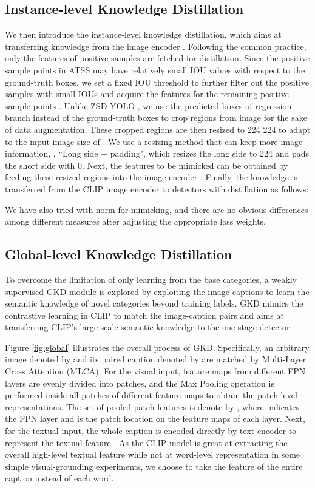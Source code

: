\documentclass[10pt,twocolumn,letterpaper]{article}
\begin{document}
\subsection{Instance-level Knowledge Distillation}
\label{sec: ins-level}
We then introduce the instance-level knowledge distillation, which aims at transferring knowledge from the image encoder . Following the common practice, only the features of positive samples are fetched for distillation. Since the positive sample points in ATSS may have relatively small IOU values with respect to the ground-truth boxes, we set a fixed IOU threshold to further filter out the positive samples with small IOUs and acquire the features for the remaining positive sample points . Unlike ZSD-YOLO \cite{xie2021zsd}, we use the predicted boxes of regression branch instead of the ground-truth boxes to crop regions from image  for the sake of data augmentation. These cropped regions are then resized to 224  224 to adapt to the input image size of . We use a resizing method that can keep more image information, \ie, ``Long side + padding", which resizes the long side to 224 and pads the short side with 0. Next, the features to be mimicked  can be obtained by feeding these resized regions  into the image encoder . Finally, the knowledge is transferred from the CLIP image encoder to detectors with distillation as follows:


We have also tried with  norm for mimicking, and there are no obvious differences among different measures after adjusting the appropriate loss weights.

\subsection{Global-level Knowledge Distillation}
To overcome the limitation of only learning from the base categories, a weakly supervised GKD module is explored by exploiting the image captions to learn the semantic knowledge of novel categories beyond training labels. GKD mimics the contrastive learning in CLIP to match the image-caption pairs and aims at transferring CLIP's large-scale semantic knowledge to the one-stage detector. 


 
Figure \ref{fig:global} illustrates the overall process of GKD. Specifically, an arbitrary image denoted by  and its paired caption denoted by  are matched by Multi-Layer Cross Attention (MLCA). For the visual input, feature maps from different FPN layers are evenly divided into  patches, and the Max Pooling operation is performed inside all patches of different feature maps to obtain the patch-level representations. The set of pooled patch features is denote by , where  indicates the FPN layer and  is the patch location on the feature maps of each layer. 
Next, for the textual input, the whole caption  is encoded directly by text encoder  to represent the textual feature . As the CLIP model is great at extracting the overall high-level textual feature while not at word-level representation in some simple visual-grounding experiments, we choose to take the feature of the entire caption instead of each word.
 
\end{document}
